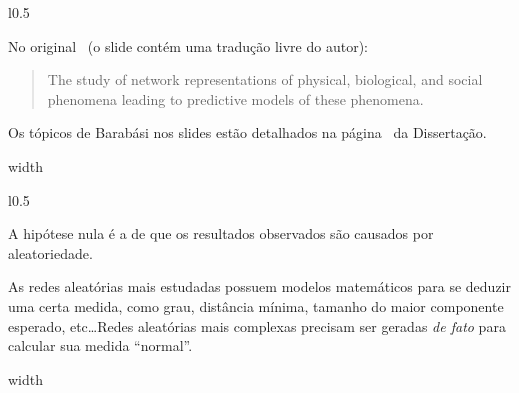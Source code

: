 \documentclass[10pt,a4paper,final]{article}
\newcommand\disappearingrule{%
  \par %
  \vskip10pt %
  \leaders\vrule width \textwidth\vskip0.4pt %
  \nointerlineskip %
  \vskip10pt %
}
\begin{document}
\begin{minipage}[t][18\baselineskip]{\linewidth}
  \begin{wrapfigure}{l}{0.5\textwidth}
  \end{wrapfigure}

  No original~\cite{National_Research_Council2006-lv} (o slide contém uma tradução livre do autor):
  
  \begin{quote}
    The study of network representations of physical, biological, and social phenomena leading to predictive models of these phenomena.
  \end{quote}

  Os tópicos de Barabási nos slides estão detalhados na página~\pageref{desc:ciencia-de-redes} da Dissertação.
\end{minipage}

\disappearingrule

\begin{minipage}[t][18\baselineskip]{\linewidth}
  \begin{wrapfigure}{l}{0.5\textwidth}
  \end{wrapfigure}
  
  A hipótese nula é a de que os resultados observados são causados por aleatoriedade.
  
  As redes aleatórias mais estudadas possuem modelos matemáticos para se deduzir uma certa medida, como grau, distância mínima, tamanho do maior componente esperado, etc\ldots Redes aleatórias mais complexas precisam ser geradas \textit{de fato} para calcular sua medida \enquote{normal}.
\end{minipage}

\disappearingrule
\end{document}
